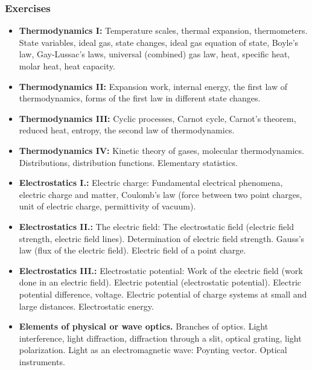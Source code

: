 \documentclass[t,aspectratio=169]{beamer}
\begin{document}
\begin{frame}
\frametitle{Exercises}
\begin{itemize}
\setlength{\parskip}{0pt}
\setlength{\itemsep}{0pt}
\item \textbf{Thermodynamics I:} Temperature scales, thermal expansion, thermometers. State variables, ideal gas, state changes, ideal gas equation of state, Boyle’s law, Gay-Lussac’s laws, universal (combined) gas law, heat, specific heat, molar heat, heat capacity.
\item \textbf{Thermodynamics II:} Expansion work, internal energy, the first law of thermodynamics, forms of the first law in different state changes.
\item \textbf{Thermodynamics III:} Cyclic processes, Carnot cycle, Carnot’s theorem, reduced heat, entropy, the second law of thermodynamics.
\item \textbf{Thermodynamics IV:} Kinetic theory of gases, molecular thermodynamics. Distributions, distribution functions. Elementary statistics.
\item \textbf{Electrostatics I.:} Electric charge: Fundamental electrical phenomena, electric charge and matter, Coulomb’s law (force between two point charges, unit of electric charge, permittivity of vacuum).

\pagebreak
\item \textbf{Electrostatics II.:} The electric field: The electrostatic field (electric field strength, electric field lines). Determination of electric field strength. Gauss’s law (flux of the electric field). Electric field of a point charge.
\item \textbf{Electrostatics III.:} Electrostatic potential: Work of the electric field (work done in an electric field). Electric potential (electrostatic potential). Electric potential difference, voltage. Electric potential of charge systems at small and large distances. Electrostatic energy.
\item \textbf{Elements of physical or wave optics.} Branches of optics. Light interference, light diffraction, diffraction through a slit, optical grating, light polarization. Light as an electromagnetic wave: Poynting vector. Optical instruments.
\end{itemize}

\end{frame}

\end{document}
